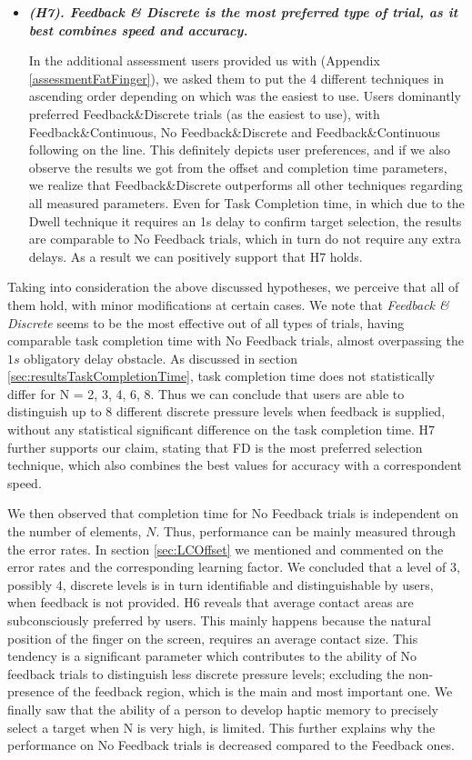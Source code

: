 \begin{itemize}
    \item \textbf{\textit{(H7). Feedback \& Discrete is the most preferred type of trial, as it best combines speed and accuracy.}}

    In the additional assessment users provided us with (Appendix \ref{assessmentFatFinger}), we asked them to put the 4 different techniques in ascending order depending on which was the easiest to use. Users dominantly preferred Feedback\&Discrete trials (as the easiest to use), with Feedback\&Continuous, No Feedback\&Discrete and Feedback\&Continuous following on the line. This definitely depicts user preferences, and if we also observe the results we got from the offset and completion time parameters, we realize that Feedback\&Discrete outperforms all other techniques regarding all measured parameters. Even for Task Completion time, in which due to the Dwell technique it requires an 1s delay to confirm target selection, the results are comparable to No Feedback trials, which in turn do not require any extra delays. As a result we can positively support that H7 holds.

\end{itemize}




Taking into consideration the above discussed hypotheses, we perceive that all of them hold, with minor modifications at certain cases. We note that \emph{Feedback \& Discrete} seems to be the most effective out of all types of trials, having comparable task completion time with No Feedback trials, almost overpassing the $1s$ obligatory delay obstacle. As discussed in section \ref{sec:resultsTaskCompletionTime}, task completion time does not statistically differ for N = 2, 3, 4, 6, 8. Thus we can conclude that users are able to distinguish up to 8 different discrete pressure levels when feedback is supplied, without any statistical significant difference on the task completion time. H7 further supports our claim, stating that FD is the most preferred selection technique, which also combines the best values for accuracy with a correspondent speed. 

We then observed that completion time for No Feedback trials is independent on the number of elements, $N$. Thus, performance can be mainly measured through the error rates. In section \ref{sec:LCOffset} we mentioned and commented on the error rates and the corresponding learning factor. 
We concluded that a level of 3, possibly 4, discrete levels is in turn identifiable and distinguishable by users, when feedback is not provided. 
H6 reveals that average contact areas are subconsciously preferred by users. This mainly happens because the natural position of the finger on the screen, requires an average contact size. This tendency is a significant parameter which contributes to the ability of No feedback trials to distinguish less discrete pressure levels; excluding the non-presence of the feedback region, which is the main and most important one.
We finally saw that the ability of a person to develop haptic memory to precisely select a target when N is very high, is limited. This further explains why the performance on No Feedback trials is decreased compared to the Feedback ones. 


